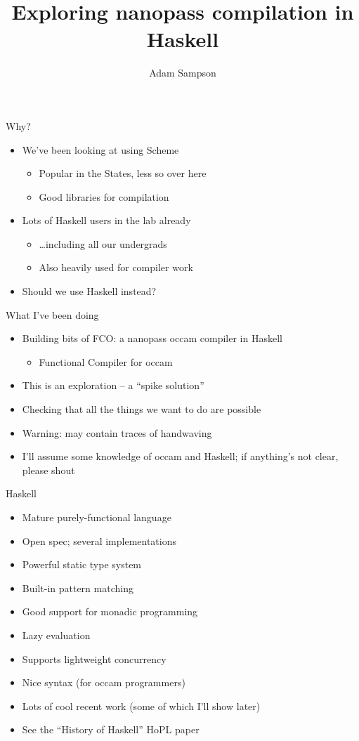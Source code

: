 \documentclass[adam,pdf,slideColor]{prosper}
\title{Exploring nanopass compilation in Haskell}
\author{Adam Sampson}
\begin{document}
\maketitle

\begin{slide}{Why?}
\begin{itemize}
\item We've been looking at using Scheme
\begin{itemize}
\item Popular in the States, less so over here
\item Good libraries for compilation
\end{itemize}
\item Lots of Haskell users in the lab already
\begin{itemize}
\item \ldots including all our undergrads
\item Also heavily used for compiler work
\end{itemize}
\item Should we use Haskell instead?
\end{itemize}
\end{slide}

\begin{slide}{What I've been doing}
\begin{itemize}
\item Building bits of FCO: a nanopass occam compiler in Haskell
\begin{itemize}
\item Functional Compiler for occam
\end{itemize}
\item This is an exploration -- a ``spike solution''
\item Checking that all the things we want to do are possible
\item Warning: may contain traces of handwaving
\item I'll assume some knowledge of occam and Haskell; if anything's
  not clear, please shout
\end{itemize}
\end{slide}

\begin{slide}{Haskell}
\begin{itemize}
\item Mature purely-functional language
\item Open spec; several implementations
\item Powerful static type system
\item Built-in pattern matching
\item Good support for monadic programming
\item Lazy evaluation
\item Supports lightweight concurrency
\item Nice syntax (for occam programmers)
\item Lots of cool recent work (some of which I'll show later)
\item See the ``History of Haskell'' HoPL paper
\end{itemize}
\end{slide}
\end{document}
